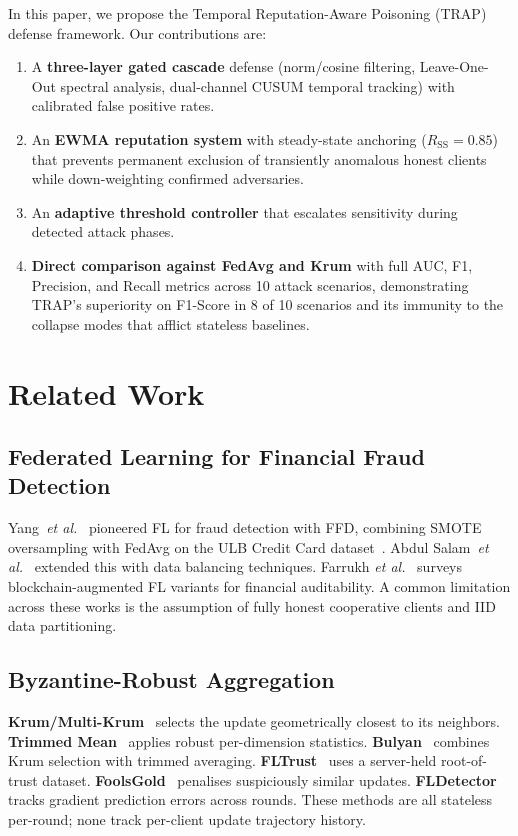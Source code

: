 \documentclass[journal]{IEEEtran}
\newcommand{\sysname}{TRAP}
\newcommand{\etal}{\textit{et al.}}
\begin{document}
In this paper, we propose the Temporal Reputation-Aware Poisoning
(\sysname{}) defense framework. Our contributions are:
\begin{enumerate}
  \item A \textbf{three-layer gated cascade} defense (norm/cosine
        filtering, Leave-One-Out spectral analysis, dual-channel CUSUM
        temporal tracking) with calibrated false positive rates.
  \item An \textbf{EWMA reputation system} with steady-state anchoring
        ($R_{\mathrm{SS}}=0.85$) that prevents permanent exclusion of
        transiently anomalous honest clients while down-weighting
        confirmed adversaries.
  \item An \textbf{adaptive threshold controller} that escalates
        sensitivity during detected attack phases.
  \item \textbf{Direct comparison against FedAvg and Krum} with full
        AUC, F1, Precision, and Recall metrics across 10 attack scenarios,
        demonstrating \sysname{}'s superiority on F1-Score in 8 of 10
        scenarios and its immunity to the collapse modes that afflict
        stateless baselines.
\end{enumerate}

\section{Related Work}

\subsection{Federated Learning for Financial Fraud Detection}
Yang~\etal~\cite{yang2019ffd} pioneered FL for fraud detection with FFD,
combining SMOTE oversampling with FedAvg on the ULB Credit Card
dataset~\cite{ulb2013ecc}. Abdul Salam~\etal~\cite{abdulsalam2024fl}
extended this with data balancing techniques. Farrukh
\etal~\cite{farrukh2025blockchain} surveys blockchain-augmented FL variants
for financial auditability. A common limitation across these works is the
assumption of fully honest cooperative clients and IID data partitioning.

\subsection{Byzantine-Robust Aggregation}
\textbf{Krum/Multi-Krum}~\cite{blanchard2017krum} selects the update
geometrically closest to its neighbors. \textbf{Trimmed
Mean}~\cite{yin2018byzantine} applies robust per-dimension statistics.
\textbf{Bulyan}~\cite{elmhamdi2018distributed} combines Krum selection
with trimmed averaging. \textbf{FLTrust}~\cite{cao2021fltrust} uses a
server-held root-of-trust dataset. \textbf{FoolsGold}~\cite{fung2018mitigating}
penalises suspiciously similar updates. \textbf{FLDetector}~\cite{zhang2022fldetector}
tracks gradient prediction errors across rounds. These methods are all
stateless per-round; none track per-client update trajectory history.
\end{document}
